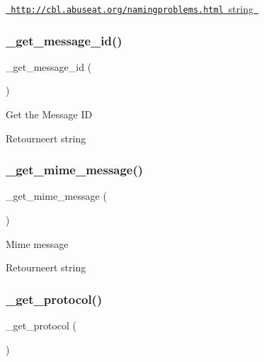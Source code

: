 \mbox{\hyperlink{}{\href{http://cbl.abuseat.org/namingproblems.html}{\texttt{ http\+://cbl.\+abuseat.\+org/namingproblems.\+html}}  string }}\mbox{\label{class_c_i___email_a253c34263736465755f85ec4192aa6b4}} 
\subsubsection{\texorpdfstring{\_get\_message\_id()}{\_get\_message\_id()}}
{\footnotesize\ttfamily \+\_\+get\+\_\+message\+\_\+id (\begin{DoxyParamCaption}{ }\end{DoxyParamCaption})\hspace{0.3cm}{\ttfamily [protected]}}

Get the Message ID

\begin{DoxyReturn}{Retourneert}
string 
\end{DoxyReturn}
\mbox{\label{class_c_i___email_a2211ba669bd8d076041d4e72bc8a9c59}} 
\subsubsection{\texorpdfstring{\_get\_mime\_message()}{\_get\_mime\_message()}}
{\footnotesize\ttfamily \+\_\+get\+\_\+mime\+\_\+message (\begin{DoxyParamCaption}{ }\end{DoxyParamCaption})\hspace{0.3cm}{\ttfamily [protected]}}

Mime message

\begin{DoxyReturn}{Retourneert}
string 
\end{DoxyReturn}
\mbox{\label{class_c_i___email_ad0000c693b4b2768f56fcc1049f8b3c7}} 
\subsubsection{\texorpdfstring{\_get\_protocol()}{\_get\_protocol()}}
{\footnotesize\ttfamily \+\_\+get\+\_\+protocol (\begin{DoxyParamCaption}{ }\end{DoxyParamCaption})\hspace{0.3cm}{\ttfamily [protected]}}

